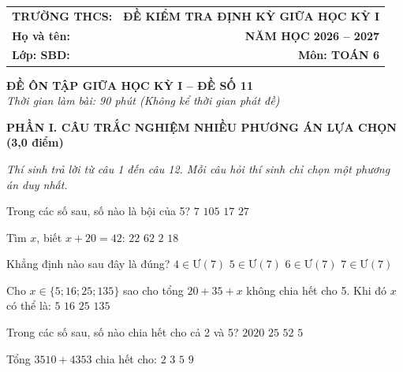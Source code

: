 \documentclass[12pt,a4paper]{article}
\begin{document}
\noindent
\begin{tabularx}{\linewidth}{X r}
\textbf{TRƯỜNG THCS: \dotfill} & \textbf{ĐỀ KIỂM TRA ĐỊNH KỲ GIỮA HỌC KỲ I} \\
\textbf{Họ và tên: \dotfill} & \textbf{NĂM HỌC 2026 -- 2027} \\
\textbf{Lớp: \dotfill \quad SBD: \dotfill} & \textbf{Môn: TOÁN 6} \\
\hline
\end{tabularx}
\vspace{2mm}

\begin{center}
  \textbf{\large ĐỀ ÔN TẬP GIỮA HỌC KỲ I -- ĐỀ SỐ 11}\\
  \textit{Thời gian làm bài: 90 phút (Không kể thời gian phát đề)}
\end{center}
\vspace{1mm}

\noindent\textbf{\large PHẦN I. CÂU TRẮC NGHIỆM NHIỀU PHƯƠNG ÁN LỰA CHỌN (3,0 điểm)}

\textit{Thí sinh trả lời từ câu 1 đến câu 12. Mỗi câu hỏi thí sinh chỉ chọn một phương án duy nhất.}

\vspace{1mm}
\begin{ex}
Trong các số sau, số nào là bội của 5?
\choice
{$7$}
{\True $105$}
{$17$}
{$27$}
\end{ex}

\begin{ex}
Tìm $x$, biết $x + 20 = 42$:
\choice
{\True $22$}
{$62$}
{$2$}
{$18$}
\end{ex}

\begin{ex}
Khẳng định nào sau đây là đúng?
\choice
{$4 \in Ư(7)$}
{$5 \in Ư(7)$}
{$6 \in Ư(7)$}
{\True $7 \in Ư(7)$}
\end{ex}

\begin{ex}
Cho $x \in \{5; 16; 25; 135\}$ sao cho tổng $20 + 35 + x$ không chia hết cho 5. Khi đó $x$ có thể là:
\choice
{$5$}
{\True $16$}
{$25$}
{$135$}
\end{ex}

\begin{ex}
Trong các số sau, số nào chia hết cho cả 2 và 5?
\choice
{\True $2020$}
{$25$}
{$52$}
{$5$}
\end{ex}

\begin{ex}
Tổng $3510 + 4353$ chia hết cho:
\choice
{$2$}
{\True $3$}
{$5$}
{$9$}
\end{ex}
\end{document}
